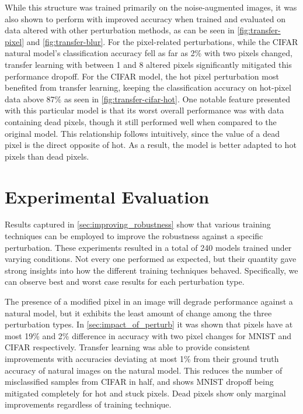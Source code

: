 \documentclass[conference]{IEEEtran}
\begin{document}
While this structure was trained primarily on the noise-augmented images, it was also shown to perform with improved accuracy when trained and evaluated on data altered with other perturbation methods, as can be seen in \autoref{fig:transfer-pixel} and \autoref{fig:transfer-blur}. For the pixel-related perturbations, while the CIFAR natural model’s classification accuracy fell as far as 2\% with two pixels changed, transfer learning with between 1 and 8 altered pixels significantly mitigated this performance dropoff. For the CIFAR model, the hot pixel perturbation most benefited from transfer learning, keeping the classification accuracy on hot-pixel data above 87\% as seen in \autoref{fig:transfer-cifar-hot}. One notable feature presented with this particular model is that its worst overall performance was with data containing dead pixels, though it still performed well when compared to the original model. This relationship follows intuitively, since the value of a dead pixel is the direct opposite of hot. As a result, the model is better adapted to hot pixels than dead pixels.

\section{Experimental Evaluation}

Results captured in \autoref{sec:improving_robustness} show that various training techniques can be employed to improve the robustness against a specific perturbation. These experiments resulted in a total of 240 models trained under varying conditions. Not every one performed as expected, but their quantity gave strong insights into how the different training techniques behaved. Specifically, we can observe best and worst case results for each perturbation type.

The presence of a modified pixel in an image will degrade performance against a natural model, but it exhibits the least amount of change among the three perturbation types. In \autoref{sec:impact_of_perturb} it was shown that pixels have at most 19\% and 2\% difference in accuracy with two pixel changes for MNIST and CIFAR respectively. Transfer learning was able to provide consistent improvements with accuracies deviating at most 1\% from their ground truth accuracy of natural images on the natural model. This reduces the number of misclassified samples from CIFAR in half, and shows MNIST dropoff being mitigated completely for hot and stuck pixels. Dead pixels show only marginal improvements regardless of training technique.
\end{document}
